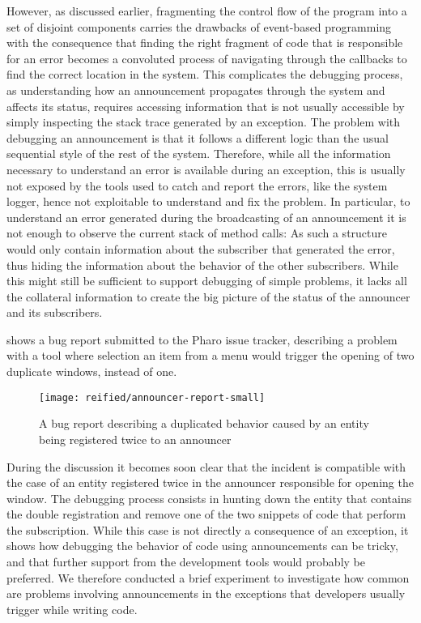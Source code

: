 However, as discussed earlier, fragmenting the control flow of the program into a set of disjoint components carries the drawbacks of event-based programming with the consequence that finding the right fragment of code that is responsible for an error becomes a convoluted process of navigating through the callbacks to find the correct location in the system. This complicates the debugging process, as understanding how an announcement propagates through the system and affects its status, requires accessing information that is not usually accessible by simply inspecting the stack trace generated by an exception. The problem with debugging an announcement is that it follows a different logic than the usual sequential style of the rest of the system. Therefore, while all the information necessary to understand an error is available during an exception, this is usually not exposed by the tools used to catch and report the errors, like the system logger, hence not exploitable to understand and fix the problem. In particular, to understand an error generated during the broadcasting of an announcement it is not enough to observe the current stack of method calls: As such a structure would only contain information about the subscriber that generated the error, thus hiding the information about the behavior of the other subscribers. While this might still be sufficient to support debugging of simple problems, it lacks all the collateral information to create the big picture of the status of the announcer and its subscribers.

  shows a bug report submitted to the Pharo issue tracker, describing a problem with a tool where selection an item from a menu would trigger the opening of two duplicate windows, instead of one.

\begin{figure}[h]
  \centering
  \texttt{[image: reified/announcer-report-small]}
  \caption{A bug report describing a duplicated behavior caused by an entity being registered twice to an announcer}
  \label{fig:announcer-report}
\end{figure}

During the discussion it becomes soon clear that the incident is compatible with the case of an entity registered twice in the announcer responsible for opening the window. The debugging process consists in hunting down the entity that contains the double registration and remove one of the two snippets of code that perform the subscription.
While this case is not directly a consequence of an exception, it shows how debugging the behavior of code using announcements can be tricky, and that further support from the development tools would probably be preferred. We therefore conducted a brief experiment to investigate how common are problems involving announcements in the exceptions that developers usually trigger while writing code.

